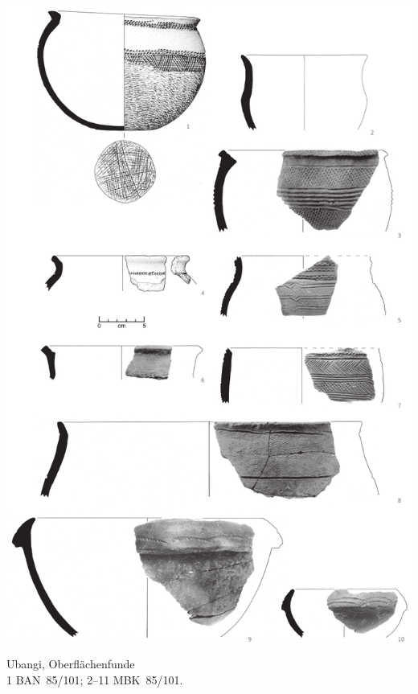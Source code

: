 \begin{pl}[H]
	\includegraphics{plt/Taf21.pdf}
	\vspace{.75em}\caption{\mbox{Ubangi}, Oberflächenfunde \\ 1 BAN~85/101; 2--11 MBK~85/101.}
	\label{pl:21}
\end{pl}

